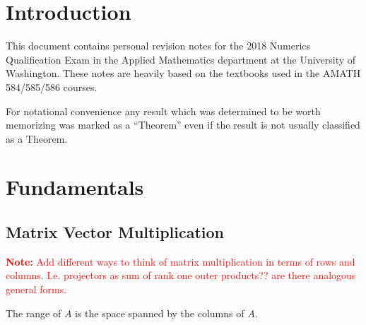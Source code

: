 \documentclass[12pt]{article}
\newcommand{\note}[1]{\textcolor{red}{\textbf{Note:} #1}}
\begin{document}
\maketitle

\pagebreak
\section{Introduction}
This document contains personal revision notes for the 2018 Numerics Qualification Exam in the Applied Mathematics department at the University of Washington. These notes are heavily based on the textbooks \cite{trefethen, leveque, greenbaum} used in the AMATH 584/585/586 courses.

For notational convenience any result which was determined to be worth memorizing was marked as a ``Theorem'' even if the result is not usually classified as a Theorem.

\tableofcontents

\pagebreak
\section{Fundamentals}
\subsection{Matrix Vector Multiplication}


\begin{definition}
\end{definition}

\begin{definition}
\end{definition}

\begin{definition}
\end{definition}

\note{Add different ways to think of matrix multiplication in terms of rows and columns. I.e. projectors as sum of rank one outer products?? are there analogous general forms.}


\begin{definition}[Range]
\end{definition}

\begin{definition}[Nullspace]
\end{definition}

\begin{theorem}
    The range of \( A \) is the space spanned by the columns of \( A \).
\end{theorem}
\end{document}

